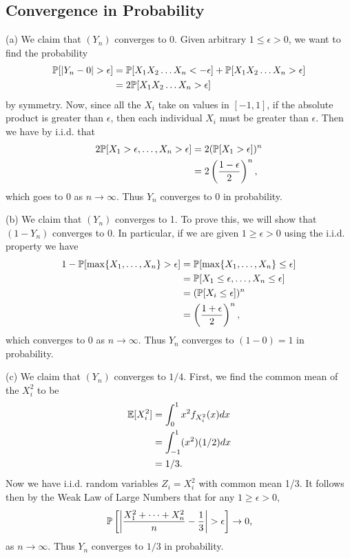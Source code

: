\subsection{Convergence in Probability}
(a) We claim that $(Y_n)$ converges to 0. Given arbitrary $1 \leq \epsilon > 0$, we want to find the probability
\begin{align*}
    \P[|Y_n - 0| > \epsilon] &= \P[X_1X_2\dots X_n < -\epsilon] + \P[X_1X_2\dots X_n > \epsilon] \\
    &= 2\P[X_1X_2\dots X_n > \epsilon]
\end{align*}
by symmetry. Now, since all the $X_i$ take on values in $[-1, 1]$, if the absolute product is greater than $\epsilon$, then each individual $X_i$ must be greater than $\epsilon$. Then we have by i.i.d. that
\begin{align*}
    2\P[X_1 > \epsilon, \dots, X_n > \epsilon] &= 2(\P[X_1 > \epsilon])^n \\
    &= 2\left(\frac{1-\epsilon}{2}\right)^n,
\end{align*}
which goes to 0 as $n \to \infty$. Thus $Y_n$ converges to 0 in probability.

(b) We claim that $(Y_n)$ converges to 1. To prove this, we will show that $(1 - Y_n)$ converges to 0. In particular, if we are given $1 \geq \epsilon > 0$ using the i.i.d. property we have
\begin{align*}
    1 - \P[\max\{X_1, \dots, X_n\} > \epsilon] &= \P[\max\{X_1, \dots, X_n\} \leq \epsilon] \\
    &= \P[X_1 \leq \epsilon, \dots, X_n \leq \epsilon] \\
    &= (\P[X_i \leq \epsilon])^n \\
    &= \left(\frac{1+\epsilon}{2}\right)^n,
\end{align*}
which converges to 0 as $n \to \infty$. Thus $Y_n$ converges to $(1 - 0) = 1$ in probability.

(c) We claim that $(Y_n)$ converges to $1/4$. First, we find the common mean of the $X_i^2$ to be
\begin{align*}
    \E[X_i^2] &= \int_0^1 x^2f_{X_i^2}(x)dx \\
    &= \int_{-1}^1 (x^2)(1/2)dx \\
    &= 1/3.
\end{align*}
Now we have i.i.d. random variables $Z_i = X_i^2$ with common mean 1/3. It follows then by the Weak Law of Large Numbers that for any $1 \geq \epsilon > 0$,
\[
    \P\left[\left|\frac{X_1^2 + \dots + X_n^2}{n} - \frac{1}{3}\right| > \epsilon\right] \to 0,
\]
as $n \to \infty$. Thus $Y_n$ converges to $1/3$ in probability.

